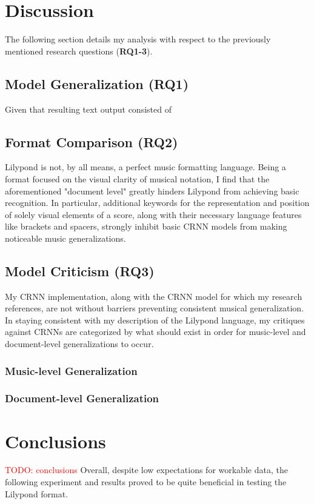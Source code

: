 \documentclass[review,sigconf]{acmart}
\newcommand{\todo}[1]{\textcolor{red}{TODO: #1}}
\begin{document}
\section{Discussion}

The following section details my analysis with respect to the previously mentioned research questions (\textbf{RQ1-3}).

\subsection{Model Generalization (RQ1)}
Given that resulting text output consisted of 

\subsection{Format Comparison (RQ2)}
Lilypond is not, by all means, a perfect music formatting language. 
Being a format focused on the visual clarity of musical notation, I find that the aforementioned "document level" greatly hinders Lilypond from achieving basic recognition.
In particular, additional keywords for the representation and position of solely visual elements of a score, 
along with their necessary language features like brackets and spacers, strongly inhibit basic CRNN models from making noticeable music generalizations.


\subsection{Model Criticism (RQ3)}
My CRNN implementation, along with the CRNN model for which my research references, are not without barriers preventing consistent musical generalization.
In staying consistent with my description of the Lilypond language, my critiques against CRNNs are categorized by what should exist in order for music-level and document-level generalizations to occur.

\subsubsection{Music-level Generalization}


\subsubsection{Document-level Generalization}

\section{Conclusions}
\todo{conclusions}
Overall, despite low expectations for workable data, the following experiment and results proved to be quite beneficial in testing the Lilypond format.



\end{document}
